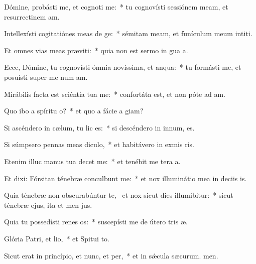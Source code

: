 \item Dómine, probásti me, et cognoti me:~* tu cognovísti sessiónem meam, et resurrectinem am.
\item Intellexísti cogitatiónes meas de ge:~* sémitam meam, et funículum meum intiti.
\item Et omnes vias meas præviti:~* quia non est sermo in gua a.
\item Ecce, Dómine, tu cognovísti ómnia novíssima, et anqua:~* tu formásti me, et posuísti super me num am.
\item Mirábilis facta est sciéntia tua  me:~* confortáta est, et non póte ad am.
\item Quo ibo a spíritu o?~* et quo a fácie a giam?
\item Si ascéndero in cælum, tu lic es:~* si descéndero in innum, es.
\item Si súmpsero pennas meas diculo,~* et habitávero in exmis ris.
\item Etenim illuc manus tua decet me:~* et tenébit me tera a.
\item Et dixi: Fórsitan ténebræ conculbunt me:~* et nox illuminátio mea in deciis is.
\item Quia ténebræ non obscurabúntur  te,~\pscross{} et nox sicut dies illumibitur:~* sicut ténebræ ejus, ita et men jus.
\item Quia tu possedísti renes os:~* suscepísti me de útero tris æ.
\item Glória Patri, et lio,~* et Spitui to.
\item Sicut erat in princípio, et nunc, et per,~* et in sǽcula sæcurum. men.
